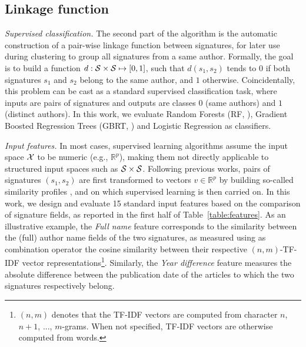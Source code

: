 \documentclass{article}
\newcommand{\glnote}[1]{\textcolor{red}{[GL: #1]}}
\begin{document}

\subsection{Linkage function}
\label{methods:linkage}

\textit{Supervised classification.} The second part of the algorithm is the
automatic construction of a pair-wise linkage function between signatures, for
later use during clustering to group all signatures from a same author.
Formally, the goal is to build a function $d: {\cal S} \times {\cal S} \mapsto
[0, 1]$, such that $d(s_1, s_2)$ tends to $0$ if both signatures $s_1$ and
$s_2$ belong to the same author, and $1$ otherwise. Coincidentally, this
problem can be cast as a standard supervised classification task, where inputs
are pairs of signatures and outputs are classes $0$ (same authors) and $1$
(distinct authors). In this work, we evaluate Random Forests (RF, \cite{breiman2001random}),
Gradient Boosted Regression Trees (GBRT, \cite{friedman2001greedy}) and Logistic Regression \citep{fan2008liblinear} as classifiers.

\textit{Input features.} In most cases, supervised learning algorithms assume
the input space ${\cal X}$ to be numeric (e.g., $\mathbb{R}^p$), making them
not directly applicable to structured input spaces such as ${\cal S} \times
{\cal S}$. Following previous works, pairs of
signatures $(s_1, s_2)$ are first transformed to vectors $v \in \mathbb{R}^p$
by building so-called similarity profiles
\citep{treeratpituk2009disambiguating}, and on which supervised learning is
then carried on. In this work, we design and evaluate 15 standard input
features based on the comparison of signature fields, as reported in the first
half of Table~\ref{table:features}. As an illustrative example, the
\textit{Full name} feature corresponds to the similarity between the (full)
author name fields of the two signatures, as measured using as combination
operator the cosine similarity between their respective $(n,m)$-TF-IDF vector
representations\footnote{$(n,m)$ denotes that the TF-IDF vectors are computed
from character $n$, $n+1$, ..., $m$-grams. When not specified, TF-IDF vectors
are otherwise computed from words.}. Similarly, the \textit{Year difference}
feature measures the absolute difference between the publication date of the
articles to which the two signatures respectively belong.
\end{document}
